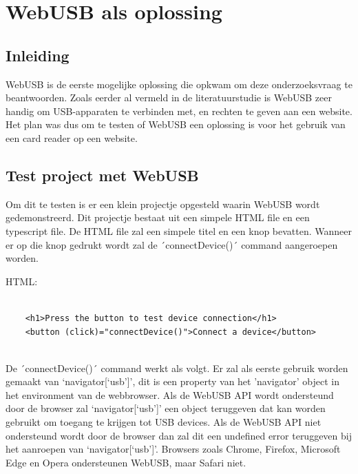 \section{WebUSB als oplossing}

\subsection{Inleiding}
WebUSB is de eerste mogelijke oplossing die opkwam om deze onderzoeksvraag te beantwoorden. Zoals eerder al vermeld in de literatuurstudie is WebUSB zeer handig om USB-apparaten te verbinden met, en rechten te geven aan een website. Het plan was dus om te testen of WebUSB een oplossing is voor het gebruik van een card reader op een website.

\subsection{Test project met WebUSB}
Om dit te testen is er een klein projectje opgesteld waarin WebUSB wordt gedemonstreerd. Dit projectje bestaat uit een simpele HTML file en een typescript file.  De HTML file zal een simpele titel en een knop bevatten. Wanneer er op die knop gedrukt wordt zal de ´connectDevice()´ command aangeroepen worden. 

HTML: 
\begin{verbatim} 
    
    <h1>Press the button to test device connection</h1> 
    <button (click)="connectDevice()">Connect a device</button> 
    
\end{verbatim} 

De ´connectDevice()´ command werkt als volgt. Er zal als eerste gebruik worden gemaakt van ‘navigator[‘usb’]’, dit is een property van het 'navigator’ object in het environment van de webbrowser. Als de WebUSB API wordt ondersteund door de browser zal ‘navigator[‘usb’]’ een object teruggeven dat kan worden gebruikt om toegang te krijgen tot USB devices. Als de WebUSB API niet ondersteund wordt door de browser dan zal dit een undefined error teruggeven bij het aanroepen van ‘navigator[‘usb’]’. Browsers zoals Chrome, Firefox, Microsoft Edge en Opera ondersteunen WebUSB, maar Safari niet. 

